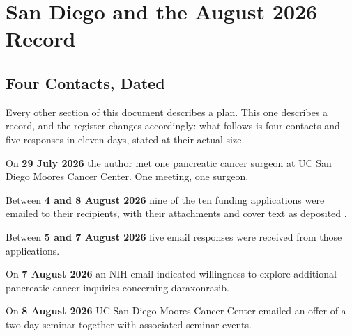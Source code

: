\section{San Diego and the August 2026 Record}

\subsection{Four Contacts, Dated}

Every other section of this document describes a plan. This one describes a
record, and the register changes accordingly: what follows is four contacts and
five responses in eleven days, stated at their actual size.

On \textbf{29 July 2026} the author met one pancreatic cancer surgeon at UC San
Diego Moores Cancer Center. One meeting, one surgeon.

Between \textbf{4 and 8 August 2026} nine of the ten funding applications were
emailed to their recipients, with their attachments and cover text as deposited
\cite{tenapps2026}.

Between \textbf{5 and 7 August 2026} five email responses were received from
those applications.

On \textbf{7 August 2026} an NIH email indicated willingness to explore
additional pancreatic cancer inquiries concerning daraxonrasib.

On \textbf{8 August 2026} UC San Diego Moores Cancer Center emailed an offer of
a two-day seminar together with associated seminar events.

